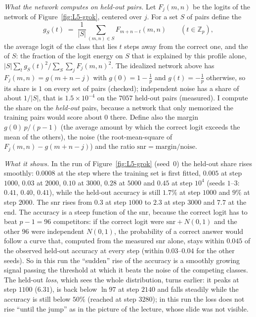 \begin{beyond}
\emph{What the network computes on held-out pairs.} Let $F_j(m,n)$ be the logits of the network of Figure~\ref{fig:L5-grok}, centered over $j$. For a set $S$ of pairs define the 
\[
  g_S(t)\;=\;\frac1{|S|}\sum_{(m,n)\in S}F_{m+n-t}(m,n)\qquad(t\in\mathbb Z_p),
\]
the average logit of the class that lies $t$ steps away from the correct one, and the  of $S$: the fraction of the logit energy on $S$ that is explained by this profile alone, $|S|\sum_tg_S(t)^2\big/\sum_{S}\sum_jF_j(m,n)^2$. The idealized network above has $F_j(m,n)=g(m+n-j)$ with $g(0)=1-\frac1p$ and $g(t)=-\frac1p$ otherwise, so its share is $1$ on every set of pairs (checked); independent noise has a share of about $1/|S|$, that is $1.5\times10^{-4}$ on the $7057$ held-out pairs (measured). I compute the share on the \emph{held-out} pairs, because a network that only memorized the training pairs would score about $0$ there. Define also the margin $g(0)\,p/(p-1)$ (the average amount by which the correct logit exceeds the mean of the others), the noise (the root-mean-square of $F_j(m,n)-g(m+n-j)$) and the ratio $\mathrm{snr}=\mathrm{margin}/\mathrm{noise}$.

\emph{What it shows.} In the run of Figure~\ref{fig:L5-grok} (seed~$0$) the held-out share rises smoothly: $0.0008$ at the step where the training set is first fitted, $0.005$ at step $1000$, $0.03$ at $2000$, $0.10$ at $3000$, $0.28$ at $5000$ and $0.45$ at step $10^4$ (seeds $1$--$3$: $0.41$, $0.40$, $0.41$), while the held-out accuracy is still $1.7\%$ at step $1000$ and $9\%$ at step $2000$. The snr rises from $0.3$ at step $1000$ to $2.3$ at step $3000$ and $7.7$ at the end. The accuracy is a steep function of the snr, because the correct logit has to beat $p-1=96$ competitors: if the correct logit were $\mathrm{snr}+N(0,1)$ and the other $96$ were independent $N(0,1)$, the probability of a correct answer would follow a curve that, computed from the measured snr alone, stays within $0.045$ of the observed held-out accuracy at every step (within $0.03$--$0.04$ for the other seeds). So in this run the ``sudden'' rise of the accuracy is a smoothly growing signal passing the threshold at which it beats the noise of the competing classes. The held-out \emph{loss}, which sees the whole distribution, turns earlier: it peaks at step $1100$ ($6.31$), is back below $\ln97$ at step $2140$ and falls steadily while the accuracy is still below $50\%$ (reached at step $3280$); in this run the loss does not rise ``until the jump'' as in the picture of the lecture, whose slide was not visible.


\end{beyond}
